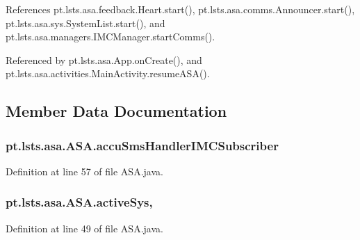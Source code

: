 References pt.\+lsts.\+asa.\+feedback.\+Heart.\+start(), pt.\+lsts.\+asa.\+comms.\+Announcer.\+start(), pt.\+lsts.\+asa.\+sys.\+System\+List.\+start(), and pt.\+lsts.\+asa.\+managers.\+I\+M\+C\+Manager.\+start\+Comms().



Referenced by pt.\+lsts.\+asa.\+App.\+on\+Create(), and pt.\+lsts.\+asa.\+activities.\+Main\+Activity.\+resume\+A\+S\+A().



\subsection{Member Data Documentation}
\hypertarget{classpt_1_1lsts_1_1asa_1_1ASA_ad6e77863d43fd469324d4e5afb8e8a4e}{}
\subsubsection[{accu\+Sms\+Handler\+I\+M\+C\+Subscriber}]{ pt.\+lsts.\+asa.\+A\+S\+A.\+accu\+Sms\+Handler\+I\+M\+C\+Subscriber\hspace{0.3cm}{\ttfamily [static]}}\label{classpt_1_1lsts_1_1asa_1_1ASA_ad6e77863d43fd469324d4e5afb8e8a4e}


Definition at line 57 of file A\+S\+A.\+java.

\hypertarget{classpt_1_1lsts_1_1asa_1_1ASA_aa3882391994a66fbda943030282f5d20}{}
\subsubsection[{active\+Sys}]{ pt.\+lsts.\+asa.\+A\+S\+A.\+active\+Sys\hspace{0.3cm}{\ttfamily [static]}, {\ttfamily [private]}}\label{classpt_1_1lsts_1_1asa_1_1ASA_aa3882391994a66fbda943030282f5d20}


Definition at line 49 of file A\+S\+A.\+java.



